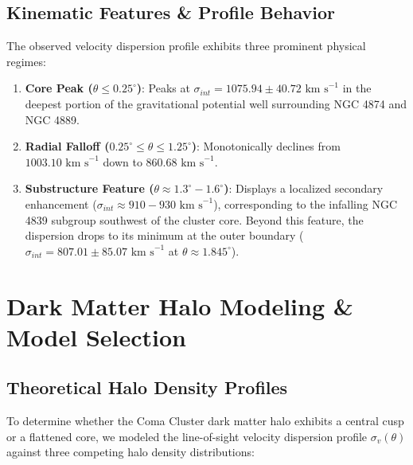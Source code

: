 \documentclass[twocolumn]{aastex631}
\begin{document}
\subsection{Kinematic Features \& Profile Behavior}

The observed velocity dispersion profile exhibits three prominent physical regimes:

\begin{enumerate}
	\item \textbf{Core Peak ($\theta \leq 0.25^{\circ}$)}: Peaks at $\sigma_{int}=1075.94 \pm 40.72 \text{ km s}^{-1}$ in the deepest portion of the gravitational potential well surrounding NGC 4874 and NGC 4889.

	\item \textbf{Radial Falloff ($0.25^{\circ} \leq \theta \leq 1.25^{\circ}$)}: Monotonically declines from $1003.10 \text{ km s}^{-1}$ down to $860.68 \text{ km s}^{-1}$.

	\item \textbf{Substructure Feature ($\theta \approx 1.3^{\circ}-1.6^{\circ}$)}: Displays a localized secondary enhancement ($\sigma_{int} \approx 910 - 930 \text{ km s}^{-1}$), corresponding to the infalling NGC 4839 subgroup southwest of the cluster core. Beyond this feature, the dispersion drops to its minimum at the outer boundary ($\sigma_{int}=807.01 \pm 85.07 \text{ km s}^{-1}$ at $\theta \approx 1.845^{\circ}$).

\end{enumerate}

\section{Dark Matter Halo Modeling \& Model Selection} \label{sec:models}

\subsection{Theoretical Halo Density Profiles}

To determine whether the Coma Cluster dark matter halo exhibits a central cusp or a flattened core, we modeled the line-of-sight velocity dispersion profile $\sigma_{v}(\theta)$ against three competing halo density distributions:
\end{document}
